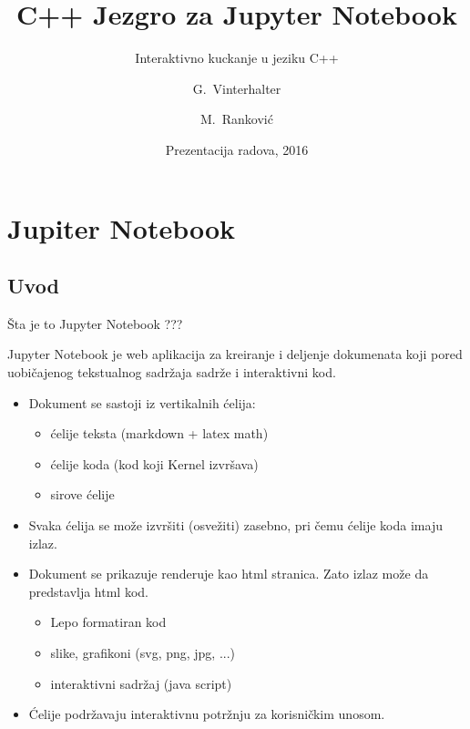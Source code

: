 \documentclass{beamer}
\title{C++ Jezgro za Jupyter Notebook}
\subtitle{Interaktivno kuckanje u jeziku C++}
\author{G.~Vinterhalter \and M.~Ranković}
\institute[Beogradski univerzitet] 
{
  Matematički fakultet, Beogradski univerzitet\\
  (Metodologija stručnog i naučnog rada)
  }
\date{Prezentacija radova, 2016}
\begin{document}
\begin{frame}
  \titlepage
\end{frame}


\section{Jupiter Notebook}

\subsection{Uvod}

\begin{frame}{Šta je to Jupyter Notebook ???}

  \quad Jupyter Notebook je web aplikacija za kreiranje i deljenje dokumenata
  koji pored uobičajenog tekstualnog sadržaja sadrže i interaktivni kod. 
  \pause


  \begin{itemize}
  \item {
      Dokument se sastoji iz vertikalnih ćelija: \pause
      \begin{itemize}
        \item ćelije teksta (markdown + latex math)
        \item ćelije koda  (kod koji Kernel izvršava)
        \item sirove ćelije
      \end{itemize}
      \pause
  }
  \item {
      Svaka ćelija se može izvršiti (osvežiti) zasebno,
      pri čemu ćelije koda imaju izlaz. 
      \pause
  }
  \item {
      Dokument se prikazuje renderuje kao html stranica. Zato izlaz može
      da predstavlja html kod. \pause
      \begin{itemize}
        \item Lepo formatiran kod
        \item slike, grafikoni (svg, png, jpg, ...)
        \item interaktivni sadržaj (java script)
      \end{itemize}

      \pause
  }
  \item{
      Ćelije podržavaju interaktivnu potržnju za korisničkim unosom.
    }
  \end{itemize}
\end{frame}
\end{document}
